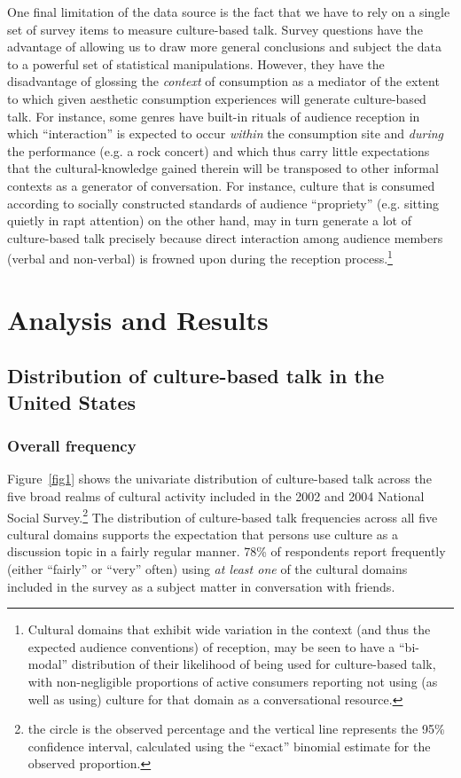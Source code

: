 \documentclass[11pt]{article}
\begin{document}
One final limitation of the data source is the fact that we have to rely on a single set of survey items to measure culture-based talk.  Survey questions have the advantage of allowing us to draw more general conclusions and subject the data to a powerful set of statistical manipulations.  However, they have the disadvantage of glossing the \emph{context} of consumption as a mediator of the extent to which given aesthetic consumption experiences will generate culture-based talk. For instance, some genres have built-in rituals of audience reception in which ``interaction'' is expected to occur \emph{within} the consumption site and \emph{during} the performance (e.g. a rock concert) and which thus carry little expectations that the cultural-knowledge gained therein will be transposed to other informal contexts as a generator of conversation.  For instance, culture that is consumed according to socially constructed standards of audience ``propriety'' (e.g. sitting quietly in rapt attention) on the other hand, may in turn generate a lot of culture-based talk precisely because direct interaction among audience members (verbal and non-verbal) is frowned upon during the reception process.\footnote{Cultural domains that exhibit wide variation in the context (and thus the expected audience conventions) of reception, may be seen to have a ``bi-modal'' distribution of their likelihood of being used for culture-based talk, with non-negligible proportions of active consumers reporting not using (as well as using) culture for that domain as a conversational resource. }  

\section{Analysis and Results}
\subsection{Distribution of culture-based talk in the United States}
\subsubsection{Overall frequency}
Figure~\ref{fig1} shows the univariate distribution of culture-based talk across the five broad realms of cultural activity included in the 2002 and 2004 National Social Survey.\footnote{the circle is the observed percentage and the vertical line represents the 95\% confidence interval, calculated using the ``exact'' binomial estimate for the observed proportion.}  The distribution of culture-based talk frequencies across all five cultural domains supports the expectation that persons use culture as a discussion topic in a fairly regular manner.  78\% of respondents report frequently (either ``fairly'' or ``very'' often) using \emph{at least one} of the cultural domains included in the survey as a subject matter in conversation with friends.
\end{document}
